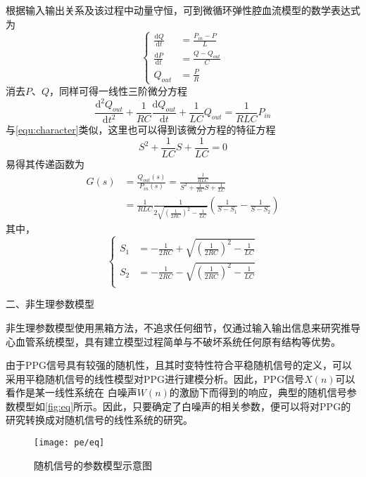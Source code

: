 根据输入输出关系及该过程中动量守恒，可到微循环弹性腔血流模型的数学表达式为
\begin{equation}
    \label{equ:wxh1}
    \left \{
    \begin{aligned}
        \frac{\mathrm{d} Q}{\mathrm{d} t} &=\frac{P_{in}-P}{L}\\
        \frac{\mathrm{d} P}{\mathrm{d} t} &=\frac{Q-Q_{out}}{C}\\
        Q_{out} &=\frac{P}{R}
    \end{aligned}
    \right.
\end{equation}
消去$P$、$Q$，同样可得一线性三阶微分方程
\begin{equation}
    \label{equ:wxh2}
    \frac{\mathrm{d^2} Q_{out}}{\mathrm{d} t^2}+\frac{1}{RC}\frac{\mathrm{d} Q_{out}}{\mathrm{d} t}+\frac{1}{LC}Q_{out}=\frac{1}{RLC}P_{in}
\end{equation}
与\autoref{equ:character}类似，这里也可以得到该微分方程的特征方程
\begin{equation}
    \label{equ:character2}
    S^2+\frac{1}{LC}S+\frac{1}{LC}=0
\end{equation}
易得其传递函数为
\begin{equation}
    \label{equ:hs}
    \begin{aligned}
    G(s) &=\frac{Q_{out}(s)}{P_{in}(s)}=\frac{\frac{1}{RLC}}{S^2+\frac{1}{RC}S+\frac{1}{LC}} \\
    &=\frac{1}{RLC}\frac{1}{2\sqrt{(\frac{1}{2RC})^2-\frac{1}{LC}}}(\frac{1}{S-S_{1}}-\frac{1}{S-S_{2}})
    \end{aligned}
\end{equation}
其中，
\begin{equation}
    \label{equ:ss}
    \left \{
    \begin{aligned}
        S_{1} &= -\frac{1}{2RC}+\sqrt{(\frac{1}{2RC})^2-\frac{1}{LC}}\\
        S_{2} &= -\frac{1}{2RC}-\sqrt{(\frac{1}{2RC})^2-\frac{1}{LC}}\\
    \end{aligned}
    \right.
\end{equation}

二、非生理参数模型

非生理参数模型使用黑箱方法，不追求任何细节，仅通过输入输出信息来研究推导心血管系统模型，具有建立模型过程简单与不破坏系统任何原有结构等优势。

由于PPG信号具有较强的随机性，且其时变特性符合平稳随机信号的定义，可以采用平稳随机信号的线性模型对PPG进行建模分析\cite{Qiu2012,PPGYY}。因此，PPG信号$X(n)$可以看作是某一线性系统在
白噪声$W(n)$的激励下而得到的响应，典型的随机信号参数模型如\autoref{fig:eq}所示。因此，只要确定了白噪声的相关参数，便可以将对PPG的研究转换成对随机信号的线性系统的研究。
\begin{figure}[htbp]
    \centering
    \texttt{[image: pe/eq]}
    \caption{\label{fig:eq}随机信号的参数模型示意图}
\end{figure}

